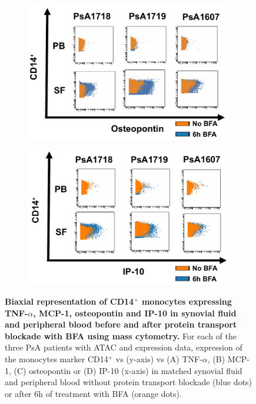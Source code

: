 \begin{figure}[H]
\begin{subfigure}[b]{0.45\textwidth}
\includegraphics[width=\textwidth]{./Results3/pdfs/PSA_0h_6h_BFA_osteopontin_mass_cytometry_PSA1718_PSA1719_PSA1607}
\caption{}
\end{subfigure}%
\begin{subfigure}[b]{0.45\textwidth} 
\centering
\includegraphics[width=\textwidth]{./Results3/pdfs/PSA_0h_6h_BFA_IP10_mass_cytometry_PSA1718_PSA1719_PSA1607}
\caption{}
\end{subfigure}
\caption[Biaxial representation of CD14$^+$ monocytes expressing TNF-$\alpha$, MCP-1, osteopontin and IP-10 in synovial fluid and peripheral blood before and after protein transport blockade with BFA using mass cytometry.]{\textbf{Biaxial representation of CD14$^+$ monocytes expressing TNF-$\alpha$, MCP-1, osteopontin and IP-10 in synovial fluid and peripheral blood before and after protein transport blockade with BFA using mass cytometry.} For each of the three PsA patients with ATAC and expression data, expression of the monocytes marker CD14$^+$ vs (y-axis) vs (A) TNF-$\alpha$, (B) MCP-1, (C) osteopontin or (D) IP-10 (x-axis) in matched synovial fluid and peripheral blood without protein transport blockade (blue dots) or after 6h of treatment with BFA (orange dots).}
\label{figure:PsA_monocytes_biaxial_TNFa_MCP1_osteopontin_IP10}
\end{figure}



